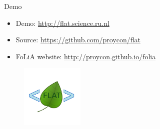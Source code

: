 \documentclass[xcolor=table,10pt,t]{beamer}
\begin{document}
\begin{frame}{Demo}
  \begin{block}{}
      \begin{itemize}
        \item Demo: \url{http://flat.science.ru.nl}
        \item Source: \url{https://github.com/proycon/flat}
        \item FoLiA website: \url{http://proycon.github.io/folia}
      \end{itemize}

      \medskip
        \begin{figure}
          \includegraphics[height=3cm]{logo.png}
        \end{figure}
  \end{block}
\end{frame}
\end{document}
